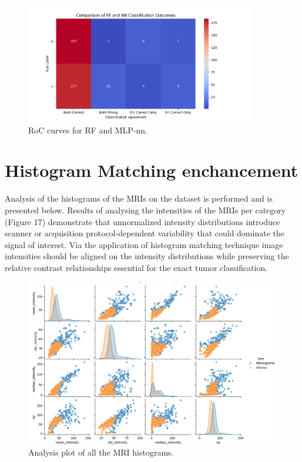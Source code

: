 \documentclass[11pt,a4paper]{article}
\begin{document}
		\begin{figure}[H]
			\centering
			\includegraphics[width=0.9\textwidth]{images/comparison.png}
			\caption{RoC curves for RF and MLP-nn.}
			\label{fig1:}
		\end{figure}		


\section{Histogram Matching enchancement}


Analysis of the histograms of the MRIs on the dataset is performed
and is presented below. Results of analysing the intensities of the 
MRIs per category (Figure 17)
demonstrate that unnormalized intensity distributions introduce scanner 
or acquisition protocol-dependent variability that
could dominate the signal of interest. 
Via the application of histogram matching technique image 
intensities should be aligned on the intensity distributions 
while preserving the relative contrast relationships 
essential for the exact tumor classification.

		\begin{figure}[H]
			\centering
			\includegraphics[width=1.0\textwidth]{images/histogram_analysis_unmatched.png}
			\caption{Analysis plot of all the MRI histograms.}
			\label{fig1:}
		\end{figure}		
\end{document}
